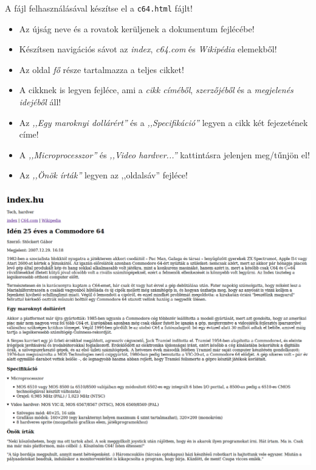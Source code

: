 \begin{frame}
  \begin{exampleblock}{}
    \footnotesize
    
    
  \end{exampleblock}
\end{frame}

\begin{frame}
  A  fájl felhasználásával készítse el a \texttt{c64.html} fájlt!
  \begin{itemize}
    \item Az újság neve és a rovatok kerüljenek a dokumentum fejlécébe!
    \item Készítsen navigációs sávot az \emph{index}, \emph{c64.com} és \emph{Wikipédia} elemekből!
    \item Az oldal \emph{fő} része tartalmazza a teljes cikket!
    \item A cikknek is legyen fejléce, ami a \emph{cikk címéből}, \emph{szerzőjéből} és a \emph{megjelenés idejéből} áll!
    \item Az \emph{,,Egy maroknyi dollárért''} és a \emph{,,Specifikáció''} legyen a cikk két fejezetének címe!
    \item A \emph{,,Microprocesszor''} és \emph{,,Video hardver...''} kattintásra jelenjen meg/tűnjön el!
    \item Az \emph{,,Önök írták''} legyen az ,,oldalsáv'' fejléce!
  \end{itemize}
\end{frame}

\begin{frame}
  \begin{exampleblock}{}
    \centering \includegraphics[scale=.14,]{c64.png}
  \end{exampleblock}
\end{frame}
